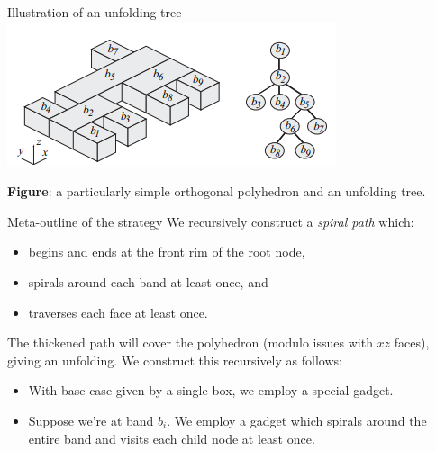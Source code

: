 \documentclass[handout]{beamer}
\theoremstyle{plain}
\begin{document}
  \begin{frame}{Illustration of an unfolding tree} 
    \includegraphics[width=\textwidth]{./figs/Unfolding_tree.png}
    \begin{center}
      \footnotesize \textbf{Figure}: a particularly simple orthogonal polyhedron and an unfolding tree. 
    \end{center}
  \end{frame}

  \begin{frame}{Meta-outline of the strategy}
    We recursively construct a \emph{spiral path} which:
    \begin{itemize}
      \item begins and ends at the front rim of the root node,
      \pause \item spirals around each band at least once, and
      \pause \item traverses each face at least once.
    \end{itemize}
    \pause The thickened path will cover the polyhedron (modulo issues with $xz$ faces), giving an unfolding.
    We construct this recursively as follows:
    \begin{itemize}
      \item With base case given by a single box, we employ a special gadget.
      \pause \item Suppose we're at band $b_i$.
        We employ a gadget which spirals around the entire band and visits each child node at least once.
    \end{itemize}
  \end{frame}
\end{document}
